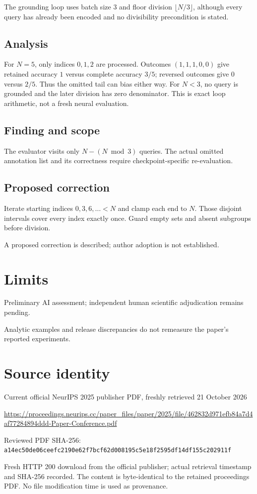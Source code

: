 \documentclass[11pt]{article}
\begin{document}
The grounding loop uses batch size \(3\) and floor division \(\lfloor N/3\rfloor\), although every query has already been encoded and no divisibility precondition is stated.

\subsection*{Analysis}

For \(N=5\), only indices \(0,1,2\) are processed. Outcomes \((1,1,1,0,0)\) give retained accuracy \(1\) versus complete accuracy \(3/5\); reversed outcomes give \(0\) versus \(2/5\). Thus the omitted tail can bias either way. For \(N<3\), no query is grounded and the later division has zero denominator. This is exact loop arithmetic, not a fresh neural evaluation.

\subsection*{Finding and scope}

The evaluator visits only \(N-(N\bmod3)\) queries. The actual omitted annotation list and its correctness require checkpoint-specific re-evaluation.

\subsection*{Proposed correction}

Iterate starting indices \(0,3,6,\ldots<N\) and clamp each end to \(N\). Those disjoint intervals cover every index exactly once. Guard empty sets and absent subgroups before division.

A proposed correction is described; author adoption is not established.

\section*{Limits}

Preliminary AI assessment; independent human scientific adjudication remains pending.\par

Analytic examples and release discrepancies do not remeasure the paper’s reported experiments.\par

\section*{Source identity}

Current official NeurIPS 2025 publisher PDF, freshly retrieved 21 October 2026

\url{https://proceedings.neurips.cc/paper_files/paper/2025/file/462832d971efb84a7d4af77284894ddd-Paper-Conference.pdf}

Reviewed PDF SHA-256: \nolinkurl{a14ec50de06ceefc2190e62f7bcf62d008195c5e18f2595df14df155c202911f}

Fresh HTTP 200 download from the official publisher; actual retrieval timestamp and SHA-256 recorded. The content is byte-identical to the retained proceedings PDF. No file modification time is used as provenance.
\end{document}
